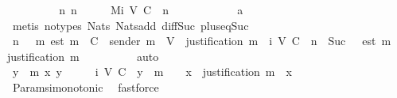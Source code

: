 \begin{isabellebody}
\ \ \ \ \ \ \isamarkupfalse%
\ \isamarkupfalse%
\ {\isachardoublequoteopen}{\isasymexists}n{\isachardot}\ n\ {\isasymin}\ {\isasymnat}\ {\isasymand}\ {\isasymsigma}\ {\isasymsubseteq}\ M{\isacharunderscore}i\ {\isacharparenleft}V{\isacharcomma}\ C{\isacharcomma}\ {\isasymepsilon}{\isacharparenright}\ {\isacharparenleft}n\ {\isacharminus}\ {}{\isacharparenright}{\isachardoublequoteclose}\isanewline
\ \ \ \ \ \ \ \ \isamarkupfalse%
\ a{}\ \isamarkupfalse%
\ {\isacharparenleft}metis\ {\isacharparenleft}no{\isacharunderscore}types{\isacharparenright}\ Nats{\isacharunderscore}{}\ Nats{\isacharunderscore}add\ diff{\isacharunderscore}Suc{\isacharunderscore}{}\ plus{\isacharunderscore}{}{\isacharunderscore}eq{\isacharunderscore}Suc{\isacharparenright}\isanewline
\ \ \ \ \ \ \isamarkupfalse%
\ \isamarkupfalse%
\ {\isachardoublequoteopen}{\isasymexists}n{\isasymin}{\isasymnat}{\isachardot}\ {\isasymsigma}\ {\isasymsubseteq}\ {\isacharbraceleft}m{\isachardot}\ est\ m\ {\isasymin}\ C\ {\isasymand}\ sender\ m\ {\isasymin}\ V\ {\isasymand}\ justification\ m\ {\isasymin}\ {\isasymSigma}{\isacharunderscore}i\ {\isacharparenleft}V{\isacharcomma}\ C{\isacharcomma}\ {\isasymepsilon}{\isacharparenright}\ {\isacharparenleft}n\ {\isacharminus}\ Suc\ {}{\isacharparenright}\ {\isasymand}\ est\ m\ {\isasymin}\ {\isasymepsilon}\ {\isacharparenleft}justification\ m{\isacharparenright}{\isacharbraceright}{\isachardoublequoteclose}\isanewline
\ \ \ \ \ \ \ \ \isamarkupfalse%
\ auto\isanewline
\ \ \ \ \isamarkupfalse%
\ \isanewline
\ \ \ \ \ \ \isamarkupfalse%
\ {\isachardoublequoteopen}{\isasymAnd}y\ {\isasymsigma}\ m\ x{\isachardot}\ y\ {\isasymin}\ {\isasymnat}\ {\isasymLongrightarrow}\ {\isasymsigma}\ {\isasymin}\ {\isasymSigma}{\isacharunderscore}i\ {\isacharparenleft}V{\isacharcomma}\ C{\isacharcomma}\ {\isasymepsilon}{\isacharparenright}\ y\ {\isasymLongrightarrow}\ m\ {\isasymin}\ {\isasymsigma}\ {\isasymLongrightarrow}\ x\ {\isasymin}\ justification\ m\ {\isasymLongrightarrow}\ x\ {\isasymin}\ {\isasymsigma}{\isachardoublequoteclose}\isanewline
\ \ \ \ \ \ \ \ \isamarkupfalse%
\ Params{\isachardot}{\isasymSigma}i{\isacharunderscore}monotonic\ \isamarkupfalse%
\ fastforce\isanewline
\ \ \ \ \isamarkupfalse%
%
\endisatagproof
{\isafoldproof}%
%
\isadelimproof
\isanewline
%
\endisadelimproof
\isanewline
\ \ \isamarkupfalse%

\end{isabellebody}
